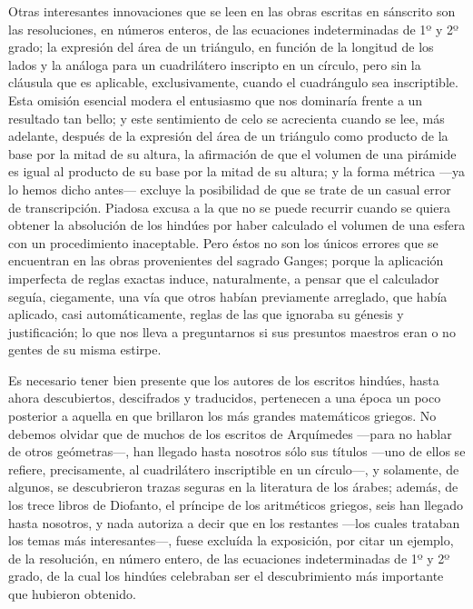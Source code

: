 \documentclass[a4paper, 12pt, draft]{article}
\begin{document}
{Otras interesantes innovaciones que se leen en las obras escritas en sánscrito son las resoluciones, en números enteros, de las ecuaciones indeterminadas de 1º y 2º grado; la expresión del área de un triángulo, en función de la longitud de los lados y la análoga para un cuadrilátero inscripto en un círculo, pero sin la cláusula que es aplicable, exclusivamente, cuando el cuadrángulo sea inscriptible. Esta omisión esencial modera el entusiasmo que nos dominaría frente a un resultado tan bello; y este sentimiento de celo se acrecienta cuando se lee, más adelante, después de la expresión del área de un triángulo como producto de la base por la mitad de su altura, la afirmación de que el volumen de una pirámide es igual al producto de su base por la mitad de su altura; y la forma métrica ---ya lo hemos dicho antes--- excluye la posibilidad de que se trate de un casual error de transcripción. Piadosa excusa a la que no se puede recurrir cuando se quiera obtener la absolución de los hindúes por haber calculado el volumen de una esfera con un procedimiento inaceptable. Pero éstos no son los únicos errores que se encuentran en las obras provenientes del sagrado Ganges; porque la aplicación imperfecta de reglas exactas induce, naturalmente, a pensar que el calculador seguía, ciegamente, una vía que otros habían previamente arreglado, que había aplicado, casi automáticamente, reglas de las que ignoraba su génesis y justificación; lo que nos lleva a preguntarnos si sus presuntos maestros eran o no gentes de su misma estirpe.





Es necesario tener bien presente que los autores de los escritos hindúes, hasta ahora descubiertos, descifrados y traducidos, pertenecen a una época un poco posterior a aquella en que brillaron los más grandes matemáticos griegos. No debemos olvidar que de muchos de los escritos de Arquímedes ---para no hablar de otros geómetras---, han llegado hasta nosotros sólo sus títulos ---uno de ellos se refiere, precisamente, al cuadrilátero inscriptible en un círculo---, y solamente, de algunos, se descubrieron trazas seguras en la literatura de los árabes; además, de los trece libros de Diofanto, el príncipe de los aritméticos griegos, seis han llegado hasta nosotros, y nada autoriza a decir que en los restantes ---los cuales trataban los temas más interesantes\mbox{---,} fuese excluída la exposición, por citar un ejemplo, de la resolución, en número entero, de las ecuaciones indeterminadas de 1º y 2º grado, de la cual los hindúes celebraban ser el descubrimiento más importante que hubieron obtenido.

}
\end{document}
